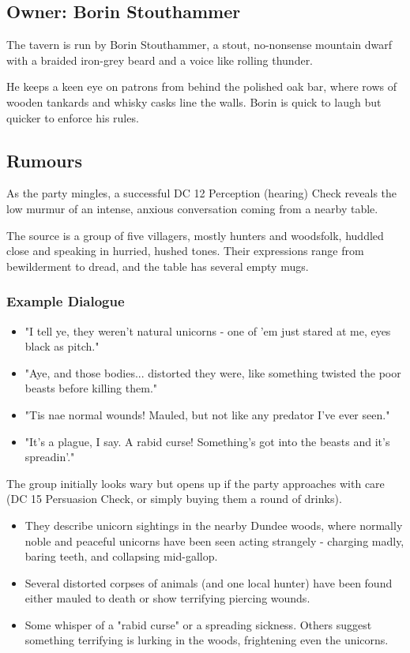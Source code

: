 \subsection*{Owner: Borin Stouthammer}
{\entryfont The tavern is run by Borin Stouthammer, a stout, no-nonsense mountain dwarf with a braided iron-grey beard and a voice like rolling thunder.

He keeps a keen eye on patrons from behind the polished oak bar, where rows of wooden tankards and whisky casks line the walls. Borin is quick to laugh but quicker to enforce his rules.}

\subsection*{Rumours}
{\entryfont As the party mingles, a successful DC 12 Perception (hearing) Check reveals the low murmur of an intense, anxious conversation coming from a nearby table.

The source is a group of five villagers, mostly hunters and woodsfolk, huddled close and speaking in hurried, hushed tones. Their expressions range from bewilderment to dread, and the table has several empty mugs.
\subsubsection*{Example Dialogue}
\begin{itemize}
	\item "I tell ye, they weren't natural unicorns - one of 'em just stared at me, eyes black as pitch."
	\item "Aye, and those bodies... distorted they were, like something twisted the poor beasts before killing them."
	\item "Tis nae normal wounds! Mauled, but not like any predator I've ever seen."
	\item "It's a plague, I say. A rabid curse! Something's got into the beasts and it's spreadin'."
\end{itemize}
The group initially looks wary but opens up if the party approaches with care (DC 15 Persuasion Check, or simply buying them a round of drinks).
\begin{itemize}
	\item They describe unicorn sightings in the nearby Dundee woods, where normally noble and peaceful unicorns have been seen acting strangely - charging madly, baring teeth, and collapsing mid-gallop.
	\item Several distorted corpses of animals (and one local hunter) have been found either mauled to death or show terrifying piercing wounds.
	\item Some whisper of a "rabid curse" or a spreading sickness. Others suggest something terrifying is lurking in the woods, frightening even the unicorns.
\end{itemize}}

